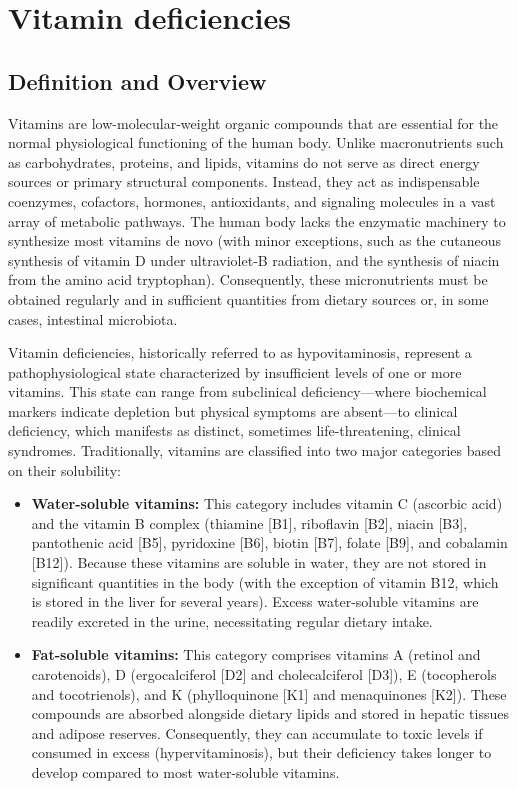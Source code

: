 \chapter{Vitamin deficiencies}

\section*{Definition and Overview}
Vitamins are low-molecular-weight organic compounds that are essential for the normal physiological functioning of the human body. Unlike macronutrients such as carbohydrates, proteins, and lipids, vitamins do not serve as direct energy sources or primary structural components. Instead, they act as indispensable coenzymes, cofactors, hormones, antioxidants, and signaling molecules in a vast array of metabolic pathways. The human body lacks the enzymatic machinery to synthesize most vitamins de novo (with minor exceptions, such as the cutaneous synthesis of vitamin D under ultraviolet-B radiation, and the synthesis of niacin from the amino acid tryptophan). Consequently, these micronutrients must be obtained regularly and in sufficient quantities from dietary sources or, in some cases, intestinal microbiota.

Vitamin deficiencies, historically referred to as hypovitaminosis, represent a pathophysiological state characterized by insufficient levels of one or more vitamins. This state can range from subclinical deficiency---where biochemical markers indicate depletion but physical symptoms are absent---to clinical deficiency, which manifests as distinct, sometimes life-threatening, clinical syndromes. Traditionally, vitamins are classified into two major categories based on their solubility:
\begin{itemize}
    \item \textbf{Water-soluble vitamins:} This category includes vitamin C (ascorbic acid) and the vitamin B complex (thiamine [B1], riboflavin [B2], niacin [B3], pantothenic acid [B5], pyridoxine [B6], biotin [B7], folate [B9], and cobalamin [B12]). Because these vitamins are soluble in water, they are not stored in significant quantities in the body (with the exception of vitamin B12, which is stored in the liver for several years). Excess water-soluble vitamins are readily excreted in the urine, necessitating regular dietary intake.
    \item \textbf{Fat-soluble vitamins:} This category comprises vitamins A (retinol and carotenoids), D (ergocalciferol [D2] and cholecalciferol [D3]), E (tocopherols and tocotrienols), and K (phylloquinone [K1] and menaquinones [K2]). These compounds are absorbed alongside dietary lipids and stored in hepatic tissues and adipose reserves. Consequently, they can accumulate to toxic levels if consumed in excess (hypervitaminosis), but their deficiency takes longer to develop compared to most water-soluble vitamins.
\end{itemize}

